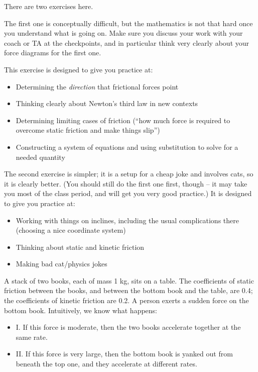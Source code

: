 \documentclass[12pt]{article}
\begin{document}
	\Large
	\centerline{}
	\normalsize
	\centerline{}
	
	
	There are two exercises here.
	
	
	\vspace{1cm}
	
	The first one is conceptually difficult, but the mathematics is not that hard once you understand what is going on. Make sure you discuss your work with your coach or TA at the checkpoints, and in particular think very clearly about your force diagrams for the first one.
	
	This exercise is designed to give you practice at:
	
	\begin{itemize}
		\item Determining the {\it direction} that frictional forces point
		\item Thinking clearly about Newton's third law in new contexts
		\item Determining limiting cases of friction (``how much force is required to overcome static friction and make things slip'')
		\item Constructing a system of equations and using substitution to solve for a needed quantity
	\end{itemize}
	
	\vspace{3cm}
	
	The second exercise is simpler; it is a setup for a cheap joke and involves cats, so it is clearly better. (You should still do the first one first, though -- it may take you most of the class period, and will get you very good practice.) It is designed to give you practice at:
	
	\begin{itemize}
		\item Working with things on inclines, including the usual complications there (choosing a nice coordinate system)
		\item Thinking about static and kinetic friction
		\item Making bad cat/physics jokes
		
	\end{itemize}
	
	\newpage
	
	
	A stack of two books, each of mass 1 kg, sits on a table. The coefficients of static friction between the books, and between the bottom book and the table, are 0.4; the coefficients of kinetic friction are 0.2. A person exerts a sudden force on the bottom book. Intuitively, we know what happens:
	\begin{itemize}
		\item{I. If this force is moderate, then the two books accelerate together at the same rate.}
		\item{II. If this force is very large, then the bottom book is yanked out from beneath the top one, and they accelerate at different rates.}
	\end{itemize}
	
\end{document}
